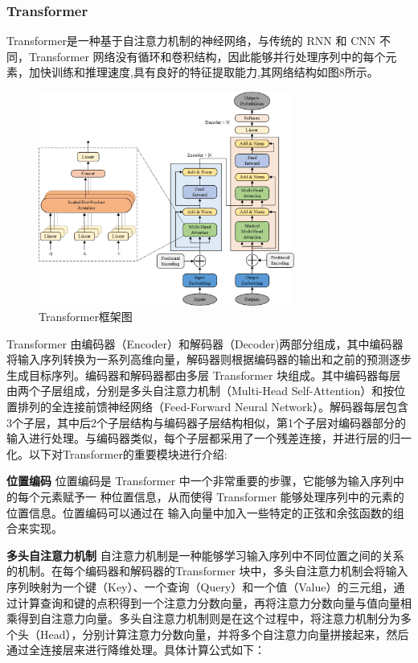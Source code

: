 \documentclass[withoutpreface,bwprint]{cumcmthesis} %
\begin{document}
	\subsubsection{ Transformer }
	Transformer是一种基于自注意力机制的神经网络，与传统的 RNN 和 CNN 不同，Transformer  网络没有循环和卷积结构，因此能够并行处理序列中的每个元素，加快训练和推理速度,具有良好的特征提取能力,其网络结构如图8所示。
	\begin{figure}[H]
		\centering
		\includegraphics[width=0.75\textwidth]{Transformer}
		\caption{Transformer框架图}
		\label{fig:circuit-diagcam}
	\end{figure}
	Transformer 由编码器（Encoder）和解码器（Decoder)两部分组成，其中编码器将输入序列转换为一系列高维向量，解码器则根据编码器的输出和之前的预测逐步生成目标序列。编码器和解码器都由多层 Transformer    块组成。其中编码器每层由两个子层组成，分别是多头自注意力机制（Multi-Head Self-Attention）和按位置排列的全连接前馈神经网络（Feed-Forward Neural Network）。解码器每层包含3个子层，其中后2个子层结构与编码器子层结构相似，第1个子层对编码器部分的输入进行处理。与编码器类似，每个子层都采用了一个残差连接，并进行层的归一化。以下对Transformer的重要模块进行介绍:
	\par{}
	\textbf{ 位置编码 }
	位置编码是 Transformer 中一个非常重要的步骤，它能够为输入序列中的每个元素赋予一
	种位置信息，从而使得 Transformer 能够处理序列中的元素的位置信息。位置编码可以通过在
	输入向量中加入一些特定的正弦和余弦函数的组合来实现。
	\par
	\textbf{ 多头自注意力机制 }
	自注意力机制是一种能够学习输入序列中不同位置之间的关系的机制。在每个编码器和解码器的Transformer 块中，多头自注意力机制会将输入序列映射为一个键（Key）、一个查询（Query）和一个值（Value）的三元组，通过计算查询和键的点积得到一个注意力分数向量，再将注意力分数向量与值向量相乘得到自注意力向量。多头自注意力机制则是在这个过程中，将注意力机制分为多个头（Head），分别计算注意力分数向量，并将多个自注意力向量拼接起来，然后通过全连接层来进行降维处理。具体计算公式如下：
\end{document}
